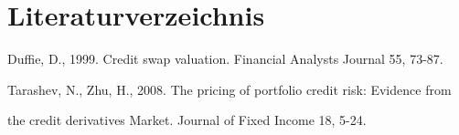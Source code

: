 \documentclass[a4paper,12pt]{scrartcl}
\begin{document}




\section{Literaturverzeichnis}

Duffie, D., 1999. Credit swap valuation. Financial Analysts Journal 55, 73-87.

Tarashev, N., Zhu, H., 2008. The pricing of portfolio credit risk: Evidence from

 the credit derivatives Market. Journal of Fixed Income 18, 5-24.
\end{document}
